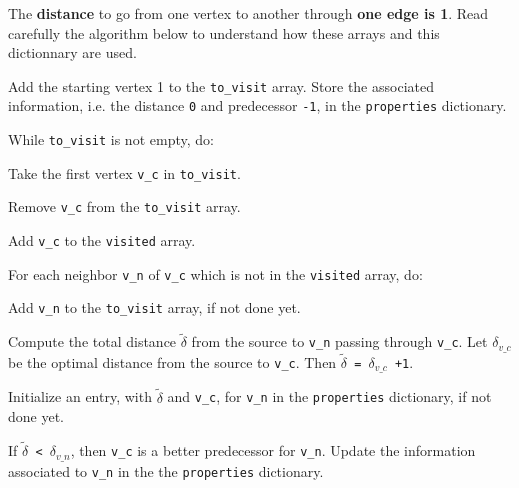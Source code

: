 \documentclass{article}
\begin{document}
\noindent
The \textbf{distance} to go from one vertex to another through \textbf{one edge is 1}. Read carefully the algorithm below to understand how these arrays and this dictionnary are used.

\medskip
\noindent
\begin{tcolorbox}[colframe=black,colback=white,title=Dijkstra’s Algorithm]
\begin{algorithmic}[1]
  \item[(Step 1)] Add the starting vertex 1 to the \texttt{to\_visit} array. Store the associated information, i.e. the distance \texttt{0} and predecessor \texttt{-1}, in the \texttt{properties} dictionary.
  
  \item[(Step 2)] While \texttt{to\_visit} is not empty, do:
  \begin{algorithmic}[1]
    \item[(Step 2.1)] Take the first vertex \texttt{v\_c} in \texttt{to\_visit}.

    \item[(Step 2.2)] Remove \texttt{v\_c} from the \texttt{to\_visit} array.

    \item[(Step 2.3)] Add \texttt{v\_c} to the \texttt{visited} array.
    
    \item[(Step 2.4)] For each neighbor \texttt{v\_n} of \texttt{v\_c} which is not in the \texttt{visited} array, do:
    \begin{algorithmic}[1]
      \item[(Step 2.4.1)] Add \texttt{v\_n} to the \texttt{to\_visit} array, if not done yet.

      \item[(Step 2.4.2)] Compute the total distance \texttt{$\tilde{\delta}$} from the source to \texttt{v\_n} passing through \texttt{v\_c}. Let \texttt{$\delta_{v\_c}$} be the optimal distance from the source to \texttt{v\_c}. Then \texttt{$\tilde{\delta}$ = $\delta_{v\_c}$ +1}.

      \item[(Step 2.4.3)] Initialize an entry, with \texttt{$\tilde{\delta}$} and \texttt{v\_c}, for \texttt{v\_n} in the \texttt{properties} dictionary, if not done yet.
      
      \item[(Step 2.4.4)] If \texttt{$\tilde{\delta}$ < $\delta_{v\_n}$}, then \texttt{v\_c} is a better predecessor for \texttt{v\_n}. Update the information associated to \texttt{v\_n} in the the \texttt{properties} dictionary.
    \end{algorithmic}
  \end{algorithmic}
\end{algorithmic}
\end{tcolorbox}
\end{document}
